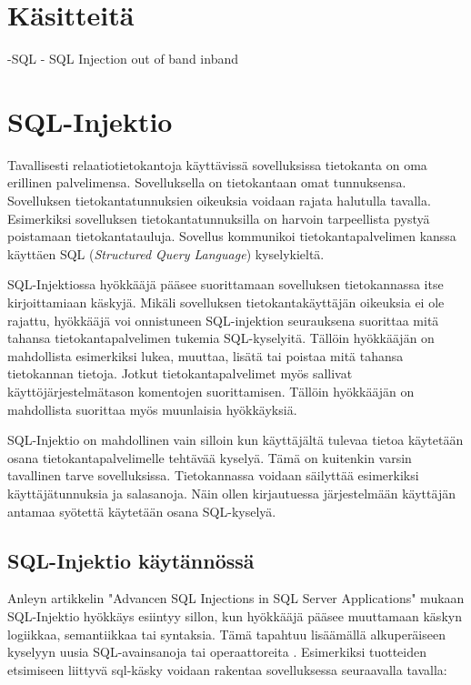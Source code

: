 \documentclass[finnish]{tktltiki2}
\theoremstyle{definition}
\theoremstyle{remark}
\begin{document}
	\section{Käsitteitä}
	-SQL
	- SQL Injection
	out of band
	inband
	\pagebreak
	
	
	
	\section{SQL-Injektio}
	Tavallisesti relaatiotietokantoja käyttävissä sovelluksissa tietokanta on oma erillinen palvelimensa. Sovelluksella on tietokantaan omat tunnuksensa. Sovelluksen tietokantatunnuksien oikeuksia voidaan rajata halutulla tavalla. Esimerkiksi sovelluksen tietokantatunnuksilla on harvoin tarpeellista pystyä poistamaan tietokantatauluja. Sovellus kommunikoi tietokantapalvelimen kanssa käyttäen SQL (\textit{Structured Query Language}) kyselykieltä.
	
	SQL-Injektiossa hyökkääjä pääsee suorittamaan sovelluksen tietokannassa itse kirjoittamiaan käskyjä. Mikäli sovelluksen tietokantakäyttäjän oikeuksia ei ole rajattu, hyökkääjä voi onnistuneen SQL-injektion seurauksena suorittaa mitä tahansa tietokantapalvelimen tukemia SQL-kyselyitä. Tällöin hyökkääjän on mahdollista esimerkiksi lukea, muuttaa, lisätä tai poistaa mitä tahansa tietokannan tietoja. Jotkut tietokantapalvelimet myös sallivat käyttöjärjestelmätason komentojen suorittamisen. Tällöin hyökkääjän on mahdollista suorittaa myös muunlaisia hyökkäyksiä. 
	
	SQL-Injektio on mahdollinen vain silloin kun käyttäjältä tulevaa tietoa käytetään osana tietokantapalvelimelle tehtävää kyselyä. Tämä on kuitenkin varsin tavallinen tarve sovelluksissa. Tietokannassa voidaan säilyttää esimerkiksi käyttäjätunnuksia ja salasanoja. Näin ollen kirjautuessa järjestelmään käyttäjän antamaa syötettä käytetään osana SQL-kyselyä.
	
	\subsection{SQL-Injektio käytännössä}
	
	Anleyn artikkelin "Advancen SQL Injections in SQL Server Applications" mukaan SQL-Injektio hyökkäys esiintyy sillon, kun hyökkääjä pääsee muuttamaan käskyn logiikkaa, semantiikkaa tai syntaksia. Tämä tapahtuu lisäämällä alkuperäiseen kyselyyn uusia SQL-avainsanoja tai operaattoreita \cite{definition}. Esimerkiksi tuotteiden etsimiseen liittyvä sql-käsky voidaan rakentaa sovelluksessa seuraavalla tavalla:
	
\end{document}
